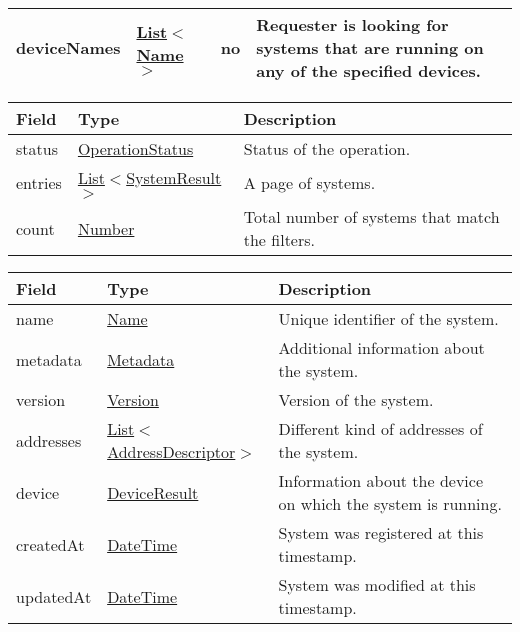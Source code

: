 \documentclass[a4paper]{arrowhead}
\newcommand{\pref}[1]{{\textcolor{ArrowheadGrey}{\hyperref[sec:model:primitives:#1]{#1}}}}
\begin{document}
\begin{table}[ht!]
\begin{tabularx}{\textwidth}{| p{4.1cm} | p{4.8cm} | p{2cm} | X |} \hline
deviceNames &  \pref{List}$<$\pref{Name}$>$ & no & Requester is looking for systems that are running on any of the specified devices. \\ \hline
\end{tabularx}
\end{table}

\label{sec:model:SystemListResponse}

\begin{table}[ht!]
\begin{tabularx}{\textwidth}{| p{3cm} | p{6cm} | X |} \hline
\rowcolor{gray!33} Field & Type      & Description \\ \hline
status & \pref{OperationStatus} & Status of the operation. \\ \hline
entries & \pref{List}$<$\hyperref[sec:model:SystemResult]{SystemResult}$>$ & A page of systems. \\ \hline
count & \pref{Number} & Total number of systems that match the filters. \\ \hline
\end{tabularx}
\end{table}

\label{sec:model:SystemResult}
 
\begin{table}[ht!]
\begin{tabularx}{\textwidth}{| p{4.25cm} | p{4cm} | X |} \hline
\rowcolor{gray!33} Field & Type      & Description \\ \hline
name & \pref{Name} & Unique identifier of the system. \\ \hline
metadata & \hyperref[sec:model:Metadata]{Metadata} & Additional information about the system. \\ \hline
version & \pref{Version} & Version of the system. \\ \hline
addresses &  \pref{List}$<$\hyperref[sec:model:AddressDescriptor]{AddressDescriptor}$>$ & Different kind of addresses of the system.  \\ \hline
device & \hyperref[sec:model:DeviceResult]{DeviceResult} & Information about the device on which the system is running. \\ \hline
createdAt & \pref{DateTime} & System was registered at this timestamp. \\ \hline
updatedAt & \pref{DateTime} & System was modified at this timestamp. \\ \hline
\end{tabularx}
\end{table}
\end{document}
